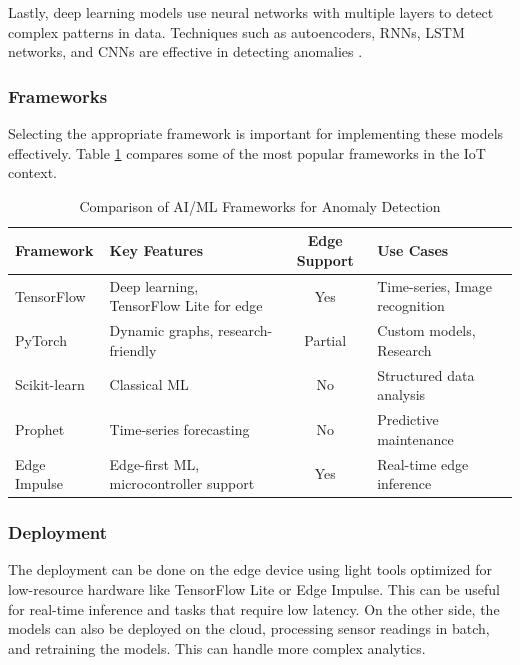 Lastly, deep learning models use neural networks with multiple layers
to detect complex patterns in data. Techniques such as autoencoders, \gls{RNNs},
\gls{LSTM} networks, and \gls{CNNs} are effective in detecting anomalies \cite{BHAROT2024574}.

\subsubsection{Frameworks}
Selecting the appropriate framework is important for implementing these models
effectively. Table \ref{tab:ai-ml:frameworks}
compares some of the most popular frameworks in the \gls{IoT} context.

\begin{table}[ht]
	\centering
	\caption{Comparison of \gls{AI}/\gls{ML} Frameworks for Anomaly Detection}
	\label{tab:ai-ml:frameworks}
	\begin{tabular}{p{3cm}p{4cm}cp{4cm}}
		\toprule
		\textbf{Framework} & \textbf{Key Features}                        & \textbf{Edge Support} & \textbf{Use Cases}             \\
		\midrule
		TensorFlow         & Deep learning, TensorFlow Lite for edge      & Yes                   & Time-series, Image recognition \\
		\midrule
		PyTorch            & Dynamic graphs, research-friendly            & Partial               & Custom models, Research        \\
		\midrule
		Scikit-learn       & Classical \gls{ML}                           & No                    & Structured data analysis       \\
		\midrule
		Prophet            & Time-series forecasting                      & No                    & Predictive maintenance         \\
		\midrule
		Edge Impulse       & Edge-first \gls{ML}, microcontroller support & Yes                   & Real-time edge inference       \\
		\bottomrule
	\end{tabular}
\end{table}

\subsubsection{Deployment}

The deployment can be done on the edge device using light tools optimized for
low-resource hardware like TensorFlow Lite or Edge Impulse. This can be useful
for real-time inference and tasks that require low latency.
On the other side, the models can also be deployed on the cloud, processing
sensor readings in batch, and retraining the models. This can handle more
complex analytics.

